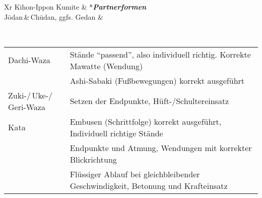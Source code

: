 \begin{tcolorbox}[colframe=OBELT,colback=white,coltitle=white,title=7. Kyu:\indent Kihon-Ido Kata - Partnerformen - Erwartungshorizont]
\begin{minipage}[t]{0.45\textwidth}
		\begin{tabularx}{\textwidth}{Xr}
			\midrule
			Kihon-Ippon Kumite 						& *{\textit{\textbf{Partnerformen}}} \\
			J\={o}dan\,\&\,Ch\={u}dan, ggfs. Gedan	& \\
			\midrule
		\end{tabularx}
	\end{minipage}\\
	\null\vfill\null
	{\small
	\begin{tabularx}{\textwidth}{ll}
		\midrule
		Dachi-Waza					& Stände \textquotedblleft passend\textquotedblright , also individuell richtig. Korrekte Mawatte (Wendung) \\
		& Ashi-Sabaki (Fußbewegungen) korrekt ausgeführt \\
		Zuki-/\,Uke-/\,Geri-Waza	& Setzen der Endpunkte, Hüft-/Schultereinsatz \\
		Kata						& Embusen (Schrittfolge) korrekt ausgeführt, Individuell richtige Stände \\
		& Endpunkte und Atmung, Wendungen mit korrekter Blickrichtung \\
		& Flüssiger Ablauf bei gleichbleibender Geschwindigkeit, Betonung und Krafteinsatz \\
		\midrule
	\end{tabularx}}\null\vfill\null
\end{tcolorbox}